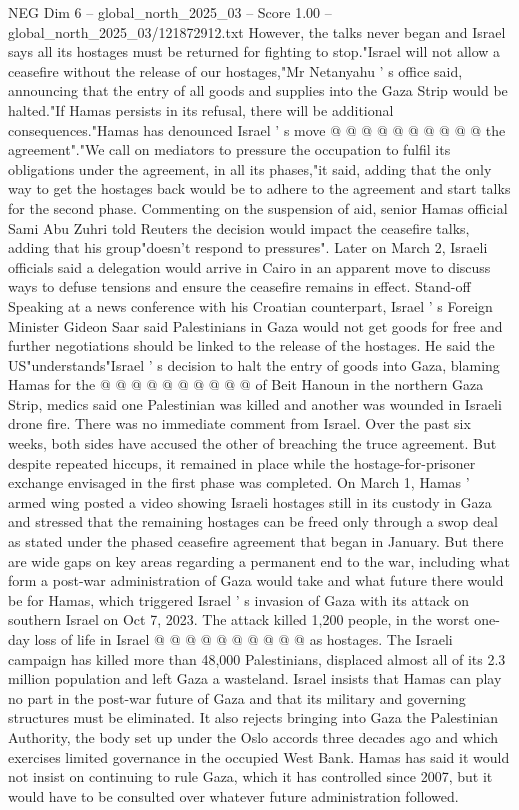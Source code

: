 \begin{textsample}{NEG Dim 6 – global\_north\_2025\_03 – Score 1.00 – global\_north\_2025\_03/121872912.txt}
However, the talks never began and Israel says all its hostages must be returned for fighting to stop."Israel will not allow a ceasefire without the release of our hostages,"Mr Netanyahu ' s office said, announcing that the entry of all goods and supplies into the Gaza Strip would be halted."If Hamas persists in its refusal, there will be additional consequences."Hamas has denounced Israel ' s move @ @ @ @ @ @ @ @ @ @ the agreement"."We call on mediators to pressure the occupation to fulfil its obligations under the agreement, in all its phases,"it said, adding that the only way to get the hostages back would be to adhere to the agreement and start talks for the second phase.
Commenting on the suspension of aid, senior Hamas official Sami Abu Zuhri told Reuters the decision would impact the ceasefire talks, adding that his group"doesn't respond to pressures".
Later on March 2, Israeli officials said a delegation would arrive in Cairo in an apparent move to discuss ways to defuse tensions and ensure the ceasefire remains in effect.
Stand-off Speaking at a news conference with his Croatian counterpart, Israel ' s Foreign Minister Gideon Saar said Palestinians in Gaza would not get goods for free and further negotiations should be linked to the release of the hostages.
He said the US"understands"Israel ' s decision to halt the entry of goods into Gaza, blaming Hamas for the @ @ @ @ @ @ @ @ @ @ of Beit Hanoun in the northern Gaza Strip, medics said one Palestinian was killed and another was wounded in Israeli drone fire.
There was no immediate comment from Israel.
Over the past six weeks, both sides have accused the other of breaching the truce agreement.
But despite repeated hiccups, it remained in place while the hostage-for-prisoner exchange envisaged in the first phase was completed.
On March 1, Hamas ' armed wing posted a video showing Israeli hostages still in its custody in Gaza and stressed that the remaining hostages can be freed only through a swop deal as stated under the phased ceasefire agreement that began in January.
But there are wide gaps on key areas regarding a permanent end to the war, including what form a post-war administration of Gaza would take and what future there would be for Hamas, which triggered Israel ' s invasion of Gaza with its attack on southern Israel on Oct 7, 2023.
The attack killed 1,200 people, in the worst one-day loss of life in Israel @ @ @ @ @ @ @ @ @ @ as hostages.
The Israeli campaign has killed more than 48,000 Palestinians, displaced almost all of its 2.3 million population and left Gaza a wasteland.
Israel insists that Hamas can play no part in the post-war future of Gaza and that its military and governing structures must be eliminated.
It also rejects bringing into Gaza the Palestinian Authority, the body set up under the Oslo accords three decades ago and which exercises limited governance in the occupied West Bank.
Hamas has said it would not insist on continuing to rule Gaza, which it has controlled since 2007, but it would have to be consulted over whatever future administration followed.

\end{textsample}

